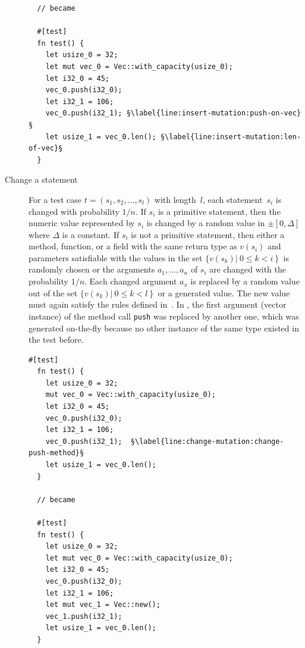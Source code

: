 \documentclass[paper=a4,%
  twoside,%
  BCOR4mm,%
  abstract=true,%
  toc=bibliography,%
  chapterprefix=true,%
  toc=bibliographynumbered,%
  open=right,%
  english,%
  pagesize=pdftex]{scrreprt}
\begin{document}
\begin{description}
\begin{lstlisting}
  // became

  #[test]
  fn test() {
    let usize_0 = 32;
    let mut vec_0 = Vec::with_capacity(usize_0);
    let i32_0 = 45;
    vec_0.push(i32_0);
    let i32_1 = 106;
    vec_0.push(i32_1); §\label{line:insert-mutation:push-on-vec}§
    let usize_1 = vec_0.len(); §\label{line:insert-mutation:len-of-vec}§
  }
  \end{lstlisting}

  \item[Change a statement] For a test case $t = (s_1, s_2, \dots, s_l)$ with length~$l$, each statement~$s_i$ is changed with probability $1/n$. If $s_i$ is a primitive statement, then the numeric value represented by $s_i$ is changed by a random value in $\pm[0,\Delta]$ where $\Delta$ is a constant. If $s_i$ is not a primitive statement, then either a method, function, or a field with the same return type as $v(s_i)$ and parameters satisfiable with the values in the set $\{v(s_k) \left|~0 \leq k < i \right\}$ is randomly chosen or the arguments $a_1, \dots, a_n$ of $s_i$ are changed with the probability $1/n$. Each changed argument $a_x$ is replaced by a random value out of the set $\{v(s_k) \left|~0 \leq k < l \right\}$ or a generated value. The new value must again satisfy the rules defined in~. In , the first argument (vector instance) of the method call \texttt{push} was replaced by another one, which was generated on-the-fly because no other instance of the same type existed in the test before.

  \begin{lstlisting}[style=boxed, label=lst:mutation-input-value, caption={The first argument (which effectively is the method owner) of the call to \emph{push} in~Line~\ref{line:change-mutation:change-push-method} has been changed to a newly created value \emph{vec\string_1}}, escapechar=§]
  #[test]
  fn test() {
    let usize_0 = 32;
    mut vec_0 = Vec::with_capacity(usize_0);
    let i32_0 = 45;
    vec_0.push(i32_0);
    let i32_1 = 106;
    vec_0.push(i32_1);  §\label{line:change-mutation:change-push-method}§
    let usize_1 = vec_0.len();
  }

  // became

  #[test]
  fn test() {
    let usize_0 = 32;
    let mut vec_0 = Vec::with_capacity(usize_0);
    let i32_0 = 45;
    vec_0.push(i32_0);
    let i32_1 = 106;
    let mut vec_1 = Vec::new();
    vec_1.push(i32_1);
    let usize_1 = vec_0.len();
  }
  \end{lstlisting}


\end{description}
\end{document}
